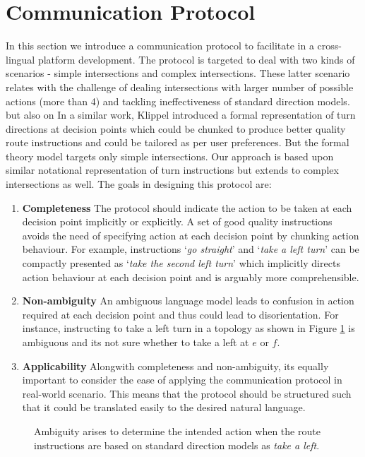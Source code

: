\documentclass{iitkthesis}
\begin{document}
  \section{Communication Protocol}
In this section we introduce a communication protocol to facilitate in a cross-lingual platform development. The protocol is targeted to deal with two kinds of scenarios - simple intersections and complex intersections. These latter scenario relates with the challenge of dealing intersections with larger number of possible actions (more than 4) and tackling ineffectiveness of standard direction models. but also on In a similar work, Klippel \cite{klippel} introduced a formal representation of turn directions at decision points which could be chunked to produce better quality route instructions and could be tailored as per user preferences. But the formal theory model targets only simple intersections. Our approach is based upon similar notational representation of turn instructions but extends to complex intersections as well. The goals in designing this protocol are:
\begin{enumerate}
\item \textbf{Completeness}
The protocol should indicate the action to be taken at each decision point implicitly or explicitly. A set of good quality instructions avoids the need of specifying action at each decision point by chunking action behaviour. For example, instructions `\textit{go straight}' and `\textit{take a left turn}' can be compactly presented as `\textit{take the second left turn}' which implicitly directs action behaviour at each decision point and is arguably more comprehensible. 
\item \textbf{Non-ambiguity}
An ambiguous language model leads to confusion in action required at each decision point and thus could lead to disorientation. For instance, instructing to take a left turn in a topology as shown in Figure \ref{fig:turnA} is ambiguous and its not sure whether to take a left at $e$ or $f$.
\item \textbf{Applicability}
Alongwith completeness and non-ambiguity, its equally important to consider the ease of applying the communication protocol in real-world scenario. This means that the protocol should be structured such that it could be translated easily to the desired natural language.
\end{enumerate}
 \begin{figure}
\centering
\caption{Ambiguity arises to determine the intended action when the route instructions are based on standard direction models as \textit{take a left}.}
\label{fig:turnA}
 \end{figure}
\end{document}
